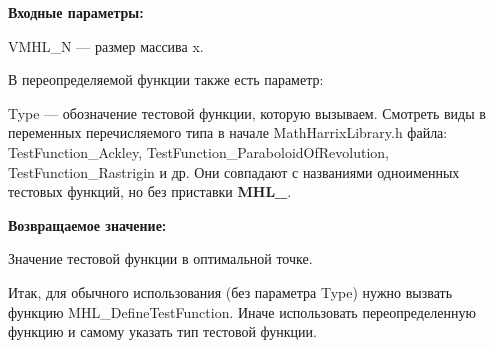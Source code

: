 \textbf{Входные параметры:}

VMHL\_N --- размер массива x.

В переопределяемой функции также есть параметр:
  
Type --- обозначение тестовой функции, которую вызываем.
Смотреть виды в переменных перечисляемого типа в начале MathHarrixLibrary.h файла: TestFunction\_Ackley, TestFunction\_ParaboloidOfRevolution, TestFunction\_Rastrigin и др. Они совпадают с названиями одноименных тестовых функций, но без приставки \textbf{MHL\_}.

\textbf{Возвращаемое значение:}
 
Значение тестовой функции в оптимальной точке.

Итак, для обычного использования (без параметра Type) нужно вызвать функцию MHL\_DefineTestFunction. Иначе использовать переопределенную функцию и самому указать тип тестовой функции.